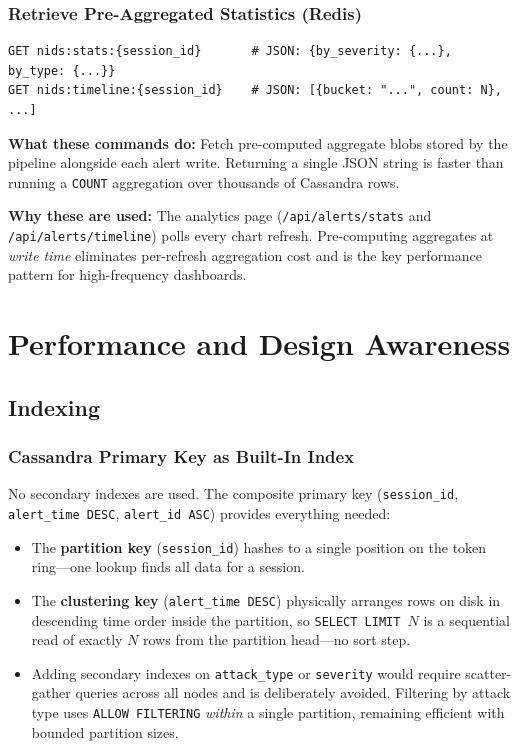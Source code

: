 \documentclass[12pt,a4paper]{report}
\begin{document}
\subsection{Retrieve Pre-Aggregated Statistics (Redis)}
\begin{lstlisting}[style=bashstyle,
  caption={Redis: Retrieve pre-computed statistics and timeline},
  label={lst:redis-get}]
GET nids:stats:{session_id}       # JSON: {by_severity: {...}, by_type: {...}}
GET nids:timeline:{session_id}    # JSON: [{bucket: "...", count: N}, ...]
\end{lstlisting}

\textbf{What these commands do:}  Fetch pre-computed aggregate blobs stored
by the pipeline alongside each alert write.  Returning a single JSON string
is faster than running a \texttt{COUNT} aggregation over thousands of Cassandra
rows.

\textbf{Why these are used:}  The analytics page (\texttt{/api/alerts/stats}
and \texttt{/api/alerts/timeline}) polls every chart refresh.
Pre-computing aggregates at \textit{write time} eliminates per-refresh
aggregation cost and is the key performance pattern for high-frequency
dashboards.

\chapter{Performance and Design Awareness}

\section{Indexing}

\subsection{Cassandra Primary Key as Built-In Index}
No secondary indexes are used.  The composite primary key
(\texttt{session\_id}, \texttt{alert\_time DESC}, \texttt{alert\_id ASC})
provides everything needed:
\begin{itemize}
  \item The \textbf{partition key} (\texttt{session\_id}) hashes to a single
        position on the token ring---one lookup finds all data for a session.
  \item The \textbf{clustering key} (\texttt{alert\_time DESC}) physically
        arranges rows on disk in descending time order inside the partition,
        so \texttt{SELECT LIMIT $N$} is a sequential read of exactly $N$ rows
        from the partition head---no sort step.
  \item Adding secondary indexes on \texttt{attack\_type} or \texttt{severity}
        would require scatter-gather queries across all nodes and is deliberately
        avoided.  Filtering by attack type uses \texttt{ALLOW FILTERING}
        \textit{within} a single partition, remaining efficient with bounded
        partition sizes.
\end{itemize}
\end{document}
